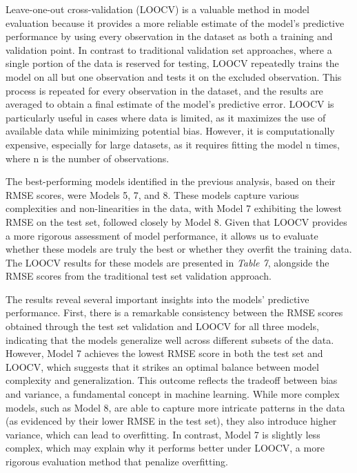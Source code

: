 \documentclass[11pt,a4paper,onecolumn]{article}
\begin{document}
        Leave-one-out cross-validation (LOOCV) is a valuable method in model evaluation because it provides a more reliable estimate of the model’s predictive performance by using every observation in the dataset as both a training and validation point. In contrast to traditional validation set approaches, where a single portion of the data is reserved for testing, LOOCV repeatedly trains the model on all but one observation and tests it on the excluded observation. This process is repeated for every observation in the dataset, and the results are averaged to obtain a final estimate of the model's predictive error. LOOCV is particularly useful in cases where data is limited, as it maximizes the use of available data while minimizing potential bias. However, it is computationally expensive, especially for large datasets, as it requires fitting the model n times, where n is the number of observations.

        The best-performing models identified in the previous analysis, based on their RMSE scores, were Models 5, 7, and 8. These models capture various complexities and non-linearities in the data, with Model 7 exhibiting the lowest RMSE on the test set, followed closely by Model 8. Given that LOOCV provides a more rigorous assessment of model performance, it allows us to evaluate whether these models are truly the best or whether they overfit the training data. The LOOCV results for these models are presented in \textit{Table 7}, alongside the RMSE scores from the traditional test set validation approach.
        
        
        The results reveal several important insights into the models' predictive performance. First, there is a remarkable consistency between the RMSE scores obtained through the test set validation and LOOCV for all three models, indicating that the models generalize well across different subsets of the data. However, Model 7 achieves the lowest RMSE score in both the test set and LOOCV, which suggests that it strikes an optimal balance between model complexity and generalization. This outcome reflects the tradeoff between bias and variance, a fundamental concept in machine learning. While more complex models, such as Model 8, are able to capture more intricate patterns in the data (as evidenced by their lower RMSE in the test set), they also introduce higher variance, which can lead to overfitting. In contrast, Model 7 is slightly less complex, which may explain why it performs better under LOOCV, a more rigorous evaluation method that penalize overfitting.
        
\end{document}
